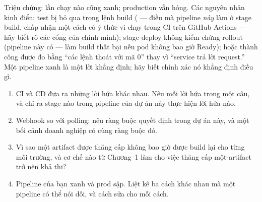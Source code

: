 \begin{pitfall}
Triệu chứng: lần chạy nào cũng xanh; production vẫn hỏng. Các nguyên
nhân kinh điển: test bị bỏ qua trong lệnh build (
--- điều mà pipeline \emph{này} làm ở stage build, chấp nhận một cách
có ý thức vì  chạy trong CI trên GitHub Actions ---
hãy biết rõ các cổng của chính mình); stage deploy không kiểm chứng
rollout (pipeline này có ---  làm build thất bại
nếu pod không bao giờ Ready); hoặc thành công được đo bằng ``các lệnh
thoát với mã 0'' thay vì ``service trả lời request.'' Một pipeline
xanh là một lời khẳng định; hãy biết chính xác nó khẳng định điều gì.
\end{pitfall}

\begin{quiz}
\begin{enumerate}
  \item CI và CD đưa ra những lời hứa khác nhau. Nêu mỗi lời hứa
  trong một câu, và chỉ ra stage nào trong pipeline của dự án này
  thực hiện lời hứa nào.
  \item Webhook so với polling: nêu ràng buộc quyết định trong dự án
  này, và một bối cảnh doanh nghiệp có cùng ràng buộc đó.
  \item Vì sao một artifact được thăng cấp không bao giờ được build
  lại cho từng môi trường, và cơ chế nào từ Chương~1 làm cho việc
  thăng cấp một-artifact trở nên khả thi?
  \item Pipeline của bạn xanh và prod sập. Liệt kê ba cách khác nhau
  mà một pipeline có thể nói dối, và cách sửa cho mỗi cách.
\end{enumerate}
\end{quiz}
